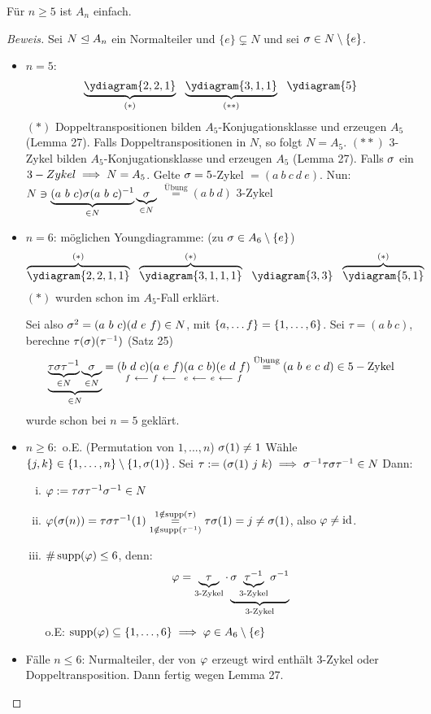 \documentclass[a4paper]{report}
\begin{document}
\begin{satz}
Für $n \ge 5$ ist $A_{n}$ einfach.
\end{satz}
\begin{proof}[Beweis]
  Sei $N \trianglelefteq A_{n}$ ein Normalteiler und $\{e\} \subsetneq N$ und sei $\sigma \in N \setminus \{e\}$.
\begin{itemize}
\item $n = 5$:
  \[\underbrace{\ydiagram{2, 2, 1}}_{(*)}\ \ \underbrace{\ydiagram{3, 1, 1}}_{(**)} \ \ \ydiagram{5}\]
  $(*)$ Doppeltranspositionen bilden $A_{5}$-Konjugationsklasse und erzeugen $A_{5}$ (Lemma 27). Falls Doppeltranspositionen in $N$, so folgt $N = A_{5}$.
  \newline
  $(**)$ 3-Zykel bilden $A_{5}$-Konjugationsklasse und erzeugen $A_{5}$ (Lemma 27). Falls $\sigma$ ein $3-Zykel \implies N = A_{5}$.
  \newline
  Gelte $\sigma = 5$-Zykel $= (a\ b\ c\ d\ e)$. Nun:
  $N \ni \underbrace{(a\ b\ c)\s(a\ b\ c)^{-1}}_{\in N} \underbrace{\s}_{\in N}$
        \(\overset{\text{Übung}} = (a\ b\ d) \text{ 3-Zykel}\)
  \item $n=6$: möglichen Youngdiagramme: (zu $\sigma \in A_{6} \setminus \{e\}$)
        \[
        \overbrace{\ydiagram{2, 2, 1, 1}}^{(*)} \ \
        \overbrace{\ydiagram{3, 1, 1, 1}}^{(*)} \ \
        \ydiagram{3, 3} \ \
        \overbrace{\ydiagram{5, 1}}^{(*)}
        \]
        $(*)$ wurden schon im $A_{5}$-Fall erklärt.

        Sei also $\sigma^{2} = (a\ b\ c)(d\ e\ f) \in N$, mit $\{a, \ldots f\} = \{1, \ldots, 6\}$. Sei $\tau = (a\ b\ c)$, berechne $\tau(\sigma)(\tau^{-1})$ (Satz 25)
        \[\underbrace{\underbrace{\tau \sigma \tau^{-1}}_{\in N} \underbrace{\sigma}_{\in N}}_{\in N} = \underset{
        f\  \longleftarrow\
        f\  \longleftarrow\ \
        e\  \longleftarrow\
        e\  \longleftarrow\  f}{(b\ d\ c)(a\ e\ f)(a\ c\ b)(e\ d\ f)}
        \overset{\text{Übung}}=(a\ b\ e\ c\ d) \in 5-\text{Zykel}\]
        wurde schon bei $n=5$ geklärt.
  \item $n \ge 6:$ o.E. (Permutation von $1, ..., n$) $\sigma(1) \ne 1$
        Wähle $\{j, k\} \in \{1, \ldots, n\} \setminus \{1, \sigma(1)\}$. Sei $\tau:= (\sigma(1)\ j \ k) \implies \sigma^{-1}\tau \sigma \tau^{-1} \in N$
        Dann:
        \begin{enumerate}[(i)]
          \item $\varphi := \tau \sigma \tau^{-1} \sigma^{-1} \in N$
          \item $\ph(\s(n)) = \tau \s \tau^{-1}(1) \overunderset{1 \notin \supp(\tau)}{1 \notin \supp(\tau^{-1})}=\tau \s(1) = j \ne \s(1)$, also $\varphi \ne \operatorname{id}$.
          \item $\# \operatorname{supp}(\varphi) \le 6$, denn:
                \[\varphi = \underbrace{\tau}_{\text{3-Zykel}} \cdot \underbrace{\sigma\underbrace{\tau^{-1}}_{\text{3-Zykel}}\sigma^{-1}}_{\text{3-Zykel}}\]
                o.E: $\operatorname{supp}(\varphi) \subseteq \{1, \ldots, 6\} \implies \varphi \in A_{6} \setminus \{e\}$
        \end{enumerate}
  \item Fälle $n \le 6$: Nurmalteiler, der von $\varphi$ erzeugt wird enthält 3-Zykel oder Doppeltransposition.
        Dann fertig wegen Lemma 27.\qedhere
\end{itemize}
\end{proof}
\end{document}
